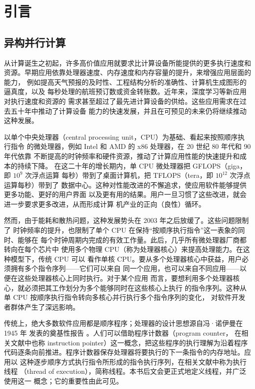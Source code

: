 \chapter{引言}
\label{chap:introduction}
\chaptercontents

\section{异构并行计算}
\label{sec:heterogeneous-parallel-computing}

从计算诞生之初起，许多高价值应用就要求比计算设备所能提供的更多执行速度和
资源。早期应用依靠处理器速度、内存速度和内存容量的提升，来增强应用层面的能力，
例如提高天气预报的及时性、工程结构分析的准确性、计算机生成图形的逼真度，以及
每秒处理的航班预订数或资金转账数。近年来，深度学习等新应用对执行速度和资源的
需求甚至超过了最先进计算设备的供给。这些应用需求在过去五十年中推动了计算设备
能力的快速发展，并且在可预见的未来仍将继续推动这种发展。

以单个中央处理器（central processing unit，CPU）为基础、看起来按照顺序执行指令
的微处理器，例如 Intel 和 AMD 的 x86 处理器，在 20 世纪 80 年代和 90 年代依靠
不断提高的时钟频率和硬件资源，推动了计算应用性能的快速提升和成本的持续下降。
在这二十年的增长期内，单 CPU 微处理器把 GFLOPS（giga，即 $10^9$ 次浮点运算
每秒）带到了桌面计算机，把 TFLOPS（tera，即 $10^{12}$ 次浮点运算每秒）带到了
数据中心。这种对性能改进的不懈追求，使应用软件能够提供更多功能、更好的用户界面
以及更有用的结果。用户一旦习惯了这些改进，就会进一步要求更多改进，从而形成计算
机产业的正向（良性）循环。

然而，由于能耗和散热问题，这种发展势头在 2003 年之后放缓了。这些问题限制了
时钟频率的提升，也限制了单个 CPU 在保持“按顺序执行指令”这一表象的同时、能够在
每个时钟周期内完成的有效工作量。此后，几乎所有微处理器厂商都转向在每个芯片中
使用多个物理 CPU（称为处理器核心）来提高处理能力。在这种模型下，传统 CPU 可以
看作单核 CPU。要从多个处理器核心中获益，用户必须拥有多个指令序列——它们可以来自
同一个应用，也可以来自不同应用——以便在这些处理器核心上同时执行。对于某个应用
而言，要想利用多个处理器核心，就必须把其工作划分为多个能够同时在这些核心上执行
的指令序列。这种从单 CPU 按顺序执行指令转向多核心并行执行多个指令序列的变化，
对软件开发者群体产生了深远影响。

传统上，绝大多数软件应用都是顺序程序；处理器的设计思想源自冯·诺伊曼在 1945 年
发表的奠基性报告 \cite{vonneumann1993}。人们可以借助程序计数器（program counter，
在相关文献中也称 instruction pointer）这一概念，把这些程序的执行理解为沿着程序
代码逐条向前推进。程序计数器保存处理器将要执行的下一条指令的内存地址。应用以
这种逐步顺序方式执行指令所形成的指令执行序列，在相关文献中称为执行线程
（thread of execution），简称线程。本书后文会更正式地定义线程，并广泛使用这一
概念；它的重要性由此可见。

